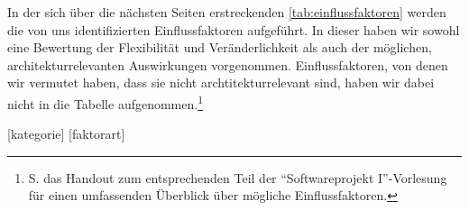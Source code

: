 \documentclass[enabledeprecatedfontcommands,fontsize=12pt,paper=a4,twoside,parskip=half]{scrartcl}
\newcounter{issue}
\newcounter{strategie}%
\begin{document}


In der sich über die nächsten Seiten erstreckenden \autoref{tab:einflussfaktoren} werden die von uns identifizierten Einflussfaktoren aufgeführt. In dieser haben wir sowohl eine Bewertung der Flexibilität und Veränderlichkeit als auch der möglichen, architekturrelevanten Auswirkungen vorgenommen. Einflussfaktoren, von denen wir vermutet haben, dass sie nicht archtitekturrelevant sind, haben wir dabei nicht in die Tabelle aufgenommen.\footnote{S. das Handout zum entsprechenden Teil der \enquote{Softwareprojekt I}-Vorlesung für einen umfassenden Überblick über mögliche Einflussfaktoren.}

[kategorie]
[faktorart]

\newcommand{\orga}{\setcounter{kategorie}{15}\setcounter{faktorart}{0}\textbf{Organisation}}
\newcommand{\technik}{\setcounter{kategorie}{20}\setcounter{faktorart}{0}\textbf{Technik}}
\newcommand{\produkt}{\setcounter{kategorie}{16}\setcounter{faktorart}{0}\textbf{Produktfaktoren}}

\newcommand{\faktorart}[1]{\stepcounter{faktorart}{\bfseries\Alph{kategorie}\arabic{faktorart}: #1}}
\renewcommand*\thefaktor{\Alph{kategorie}\thefaktorart.\arabic{faktor}}
\newcommand{\faktor}{\refstepcounter{faktor}\thefaktor}




\newcommand{\faktorartEintrag}[1]{\multicolumn{3}{|l|}{\faktorart{#1}} \\\nobreakhline}
\newcommand{\faktorEintrag}[4]{\multicolumn{3}{|l|}{\faktor: #1} \\\nobreakhline #2 & #3 & #4 \\\hline}
\end{document}
